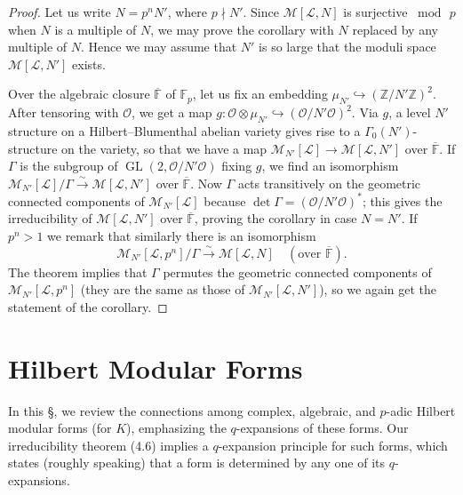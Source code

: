 \documentclass[12pt,a4paper]{article}
\theoremstyle{plain}
\theoremstyle{definition}
\theoremstyle{remark}
\DeclareMathOperator{\GL}{GL}
\begin{document}
\begin{proof}
Let us write $N = p^n N'$, where $p \nmid N'$. Since $\mathscr{M}[\mathscr{L}, N]$ is surjective $\bmod\, p$ when $N$ is a multiple of $N$, we may prove the corollary with $N$ replaced by any multiple of $N$. Hence we may assume that $N'$ is so large that the moduli space $\mathscr{M}[\mathscr{L}, N']$ exists.

Over the algebraic closure $\overline{\mathbb{F}}$ of $\mathbb{F}_p$, let us fix an embedding $\mu_{N'} \hookrightarrow (\mathbb{Z}/N'\mathbb{Z})^2$. After tensoring with $\mathcal{O}$, we get a map $g: \mathcal{O} \otimes \mu_{N'} \hookrightarrow (\mathcal{O}/N'\mathcal{O})^2$. Via $g$, a level $N'$ structure on a Hilbert--Blumenthal abelian variety gives rise to a $\Gamma_0(N')$-structure on the variety, so that we have a map $\mathscr{M}_{N'}[\mathscr{L}] \to \mathscr{M}[\mathscr{L}, N']$ over $\overline{\mathbb{F}}$. If $\Gamma$ is the subgroup of $\GL(2, \mathcal{O}/N'\mathcal{O})$ fixing $g$, we find an isomorphism $\mathscr{M}_{N'}[\mathscr{L}]/\Gamma \xrightarrow{\sim} \mathscr{M}[\mathscr{L}, N']$ over $\overline{\mathbb{F}}$. Now $\Gamma$ acts transitively on the geometric connected components of $\mathscr{M}_{N'}[\mathscr{L}]$ because $\det \Gamma = (\mathcal{O}/N'\mathcal{O})^*$; this gives the irreducibility of $\mathscr{M}[\mathscr{L}, N']$ over $\overline{\mathbb{F}}$, proving the corollary in case $N = N'$. If $p^n > 1$ we remark that similarly there is an isomorphism
\[
\mathscr{M}_{N'}[\mathscr{L}, p^n]/\Gamma \xrightarrow{\sim} \mathscr{M}[\mathscr{L}, N] \quad (\text{over } \overline{\mathbb{F}}).
\]
The theorem implies that $\Gamma$ permutes the geometric connected components of $\mathscr{M}_{N'}[\mathscr{L}, p^n]$ (they are the same as those of $\mathscr{M}_{N'}[\mathscr{L}, N']$), so we again get the statement of the corollary.
\end{proof}

\section{Hilbert Modular Forms}\label{sec:5}

In this \S, we review the connections among complex, algebraic, and $p$-adic Hilbert modular forms (for $K$), emphasizing the $q$-expansions of these forms. Our irreducibility theorem (4.6) implies a $q$-expansion principle for such forms, which states (roughly speaking) that a form is determined by any one of its $q$-expansions.
\end{document}
